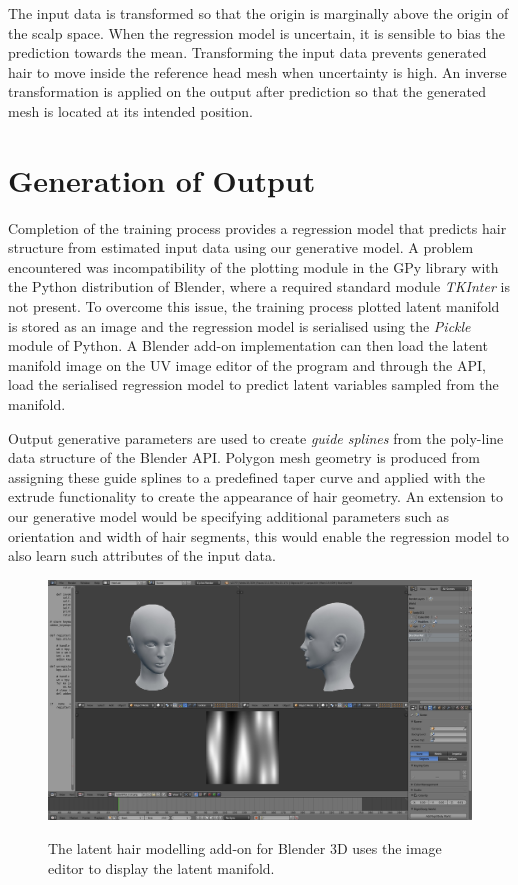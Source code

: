 \documentclass[ %
author={Dillon Keith Diep},
supervisor={Dr. Carl Henrik Ek},
degree={MEng},
title={ART-CG:},
subtitle={Assisted Real-time Content Generation of 3D Hair by Learning Manifolds},
type={Research},
year={2017} ]{dissertation}
\begin{document}
The input data is transformed so that the origin is marginally above the origin of the scalp space. When the regression model is uncertain, it is sensible to bias the prediction towards the mean. Transforming the input data prevents generated hair to move inside the reference head mesh when uncertainty is high. An inverse transformation is applied on the output after prediction so that the generated mesh is located at its intended position. 

\section{Generation of Output}
Completion of the training process provides a regression model that predicts hair structure from estimated input data using our generative model. A problem encountered was incompatibility of the plotting module in the GPy library with the Python distribution of Blender, where a required standard module \textit{TKInter} is not present. To overcome this issue, the training process plotted latent manifold is stored as an image and the regression model is serialised using the \textit{Pickle} module of Python. A Blender add-on implementation can then load the latent manifold image on the UV image editor of the program and through the API, load the serialised regression model to predict latent variables sampled from the manifold.

Output generative parameters are used to create \textit{guide splines} from the poly-line data structure of the Blender API. Polygon mesh geometry is produced from assigning these guide splines to a predefined taper curve and applied with the extrude functionality to create the appearance of hair geometry. An extension to our generative model would be specifying additional parameters such as orientation and width of hair segments, this would enable the regression model to also learn such attributes of the input data.

\begin{figure}[!h]
	\centering
	\includegraphics[scale=0.2]{images/latentHairAddon}\\
	\caption{The latent hair modelling add-on for Blender 3D uses the image editor to display the latent manifold.}
	\label{blenderAddon}
\end{figure}
\end{document}
